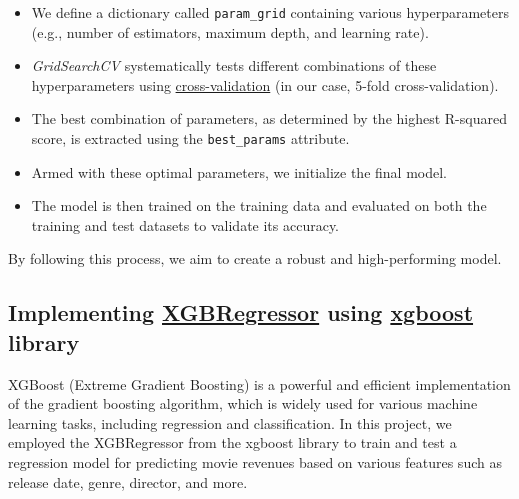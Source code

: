 \documentclass[conference]{IEEEtran}
\begin{document}
    \begin{itemize}
        \item We define a dictionary called \texttt{param\_grid} containing various hyperparameters (e.g., number of estimators, maximum depth, and learning rate).
        \item \textit{GridSearchCV} systematically tests different combinations of these hyperparameters using \href{https://scikit-learn.org/stable/modules/cross_validation.html}{cross-validation} (in our case, 5-fold cross-validation).
        \item The best combination of parameters, as determined by the highest R-squared score, is extracted using the \texttt{best\_params} attribute.
        \item Armed with these optimal parameters, we initialize the final model.
        \item The model is then trained on the training data and evaluated on both the training and test datasets to validate its accuracy.
    \end{itemize}

    By following this process, we aim to create a robust and high-performing model.

    \subsection{Implementing \href{https://xgboost.readthedocs.io/en/latest/python/python_api.html}{XGBRegressor} using \href{https://xgboost.readthedocs.io/en/stable/}{xgboost} library}
    XGBoost (Extreme Gradient Boosting) is a powerful and efficient implementation of the gradient boosting algorithm, which is widely used for various machine learning tasks, including regression and classification. In this project, we employed the XGBRegressor from the xgboost library to train and test a regression model for predicting movie revenues based on various features such as release date, genre, director, and more.
\end{document}

